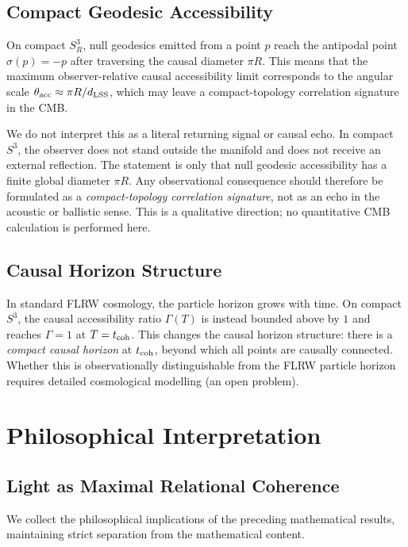 \documentclass[12pt,a4paper]{article}
\theoremstyle{plain}
\theoremstyle{definition}
\theoremstyle{remark}
\begin{document}
\subsection{Compact Geodesic Accessibility}

On compact $S^3_R$, null geodesics emitted from a point $p$ reach the antipodal
point $\sigma(p) = -p$ after traversing the causal diameter $\pi R$.
This means that the maximum observer-relative causal accessibility limit
corresponds to the angular scale $\theta_{\rm acc} \approx \pi R/d_{\rm LSS}$,
which may leave a compact-topology correlation signature in the CMB.

We do not interpret this as a literal returning signal or causal echo.
In compact $S^3$, the observer does not stand outside the manifold and does not
receive an external reflection.
The statement is only that null geodesic accessibility has a finite global diameter
$\pi R$.
Any observational consequence should therefore be formulated as a
\emph{compact-topology correlation signature}, not as an echo in the acoustic or
ballistic sense.
This is a qualitative direction; no quantitative CMB calculation is performed here.

\subsection{Causal Horizon Structure}

In standard FLRW cosmology, the particle horizon grows with time.
On compact $S^3$, the causal accessibility ratio $\Gamma(T)$ is instead
bounded above by $1$ and reaches $\Gamma = 1$ at $T = t_{\rm coh}$.
This changes the causal horizon structure:
there is a \emph{compact causal horizon} at $t_{\rm coh}$,
beyond which all points are causally connected.
Whether this is observationally distinguishable from the FLRW particle horizon
requires detailed cosmological modelling (an open problem).

\section{Philosophical Interpretation}
\label{sec:philosophy}

\subsection{Light as Maximal Relational Coherence}

We collect the philosophical implications of the preceding mathematical results,
maintaining strict separation from the mathematical content.
\end{document}
